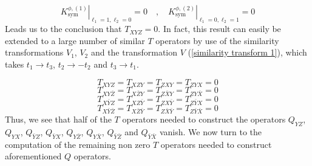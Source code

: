 %
%
\begin{equation}
\left. K^{\phi,(1)}_{\text{sym}} \right|_{\ell_1=1, \ell_2=0} = 0
%
\quad , \quad
%
\left. K^{\phi,(2)}_{\text{sym}} \right|_{\ell_1=0, \ell_2=1} = 0
\end{equation}
%
%
Leads us to the conclusion that $T_{XYZ} = 0$. In fact, this result can easily be extended to a large number of similar $T$ operators by use of the similarity transformations $V_1$, $V_2$ and the transformation $V$ (\ref{similarity transform 1}), which takes $t_1 \to t_3$, $t_2 \to -t_2$ and $t_3 \to t_1$.
%
%

\newpage
\begin{equation}\label{vanishing T operators 1}
T_{XYZ} = T_{XZY} = T_{ZXY} = T_{ZYX} = 0
\end{equation}
%
%
\begin{equation}\label{vanishing T operators 2}
T_{XY\bar{Z}} = T_{X\bar{Z}Y} = T_{Z\bar{X}Y} = T_{ZY\bar{X}} = 0
\end{equation}
%
%
\begin{equation}\label{vanishing T operators 3}
T_{X\bar{Y}Z} = T_{XZ\bar{Y}} = T_{ZX\bar{Y}} = T_{Z\bar{Y}X} = 0
\end{equation}
%
%
\begin{equation}\label{vanishing T operators 4}
T_{X\bar{Y}\bar{Z}} = T_{X\bar{Z}\bar{Y}} = T_{Z\bar{X}\bar{Y}} = T_{Z\bar{Y}\bar{X}} = 0
\end{equation}
%
%
Thus, we see that half of the $T$ operators needed to construct the operators $Q_{YZ}$, $Q_{YX}$, $Q_{\bar{Y}Z}$, $Q_{\bar{Y}X}$, $Q_{Y\bar{Z}}$, $Q_{Y\bar{X}}$, $Q_{\bar{Y}\bar{Z}}$ and $Q_{\bar{Y}\bar{X}}$ vanish. We now turn to the computation of the remaining non zero $T$ operators needed to construct aforementioned $Q$ operators.
%
%
